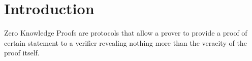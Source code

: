 

\section{Introduction}

Zero Knowledge Proofs are protocols that allow a prover to provide a proof of certain statement to a verifier revealing nothing more than the veracity of the proof itself.


